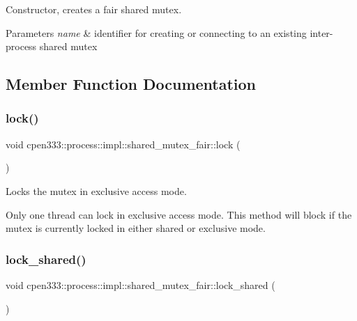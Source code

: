 Constructor, creates a fair shared mutex. 


\begin{DoxyParams}{Parameters}
{\em name} & identifier for creating or connecting to an existing inter-\/process shared mutex \\
\hline
\end{DoxyParams}


\subsection{Member Function Documentation}
\mbox{\label{classcpen333_1_1process_1_1impl_1_1shared__mutex__fair_a85de84ee97bdf015411169a02935dc4d}} 
\subsubsection{\texorpdfstring{lock()}{lock()}}
{\footnotesize\ttfamily void cpen333\+::process\+::impl\+::shared\+\_\+mutex\+\_\+fair\+::lock (\begin{DoxyParamCaption}{ }\end{DoxyParamCaption})\hspace{0.3cm}{\ttfamily [inline]}}



Locks the mutex in exclusive access mode. 

Only one thread can lock in exclusive access mode. This method will block if the mutex is currently locked in either shared or exclusive mode. \mbox{\label{classcpen333_1_1process_1_1impl_1_1shared__mutex__fair_a11641159a61a83eda9713891f9f29159}} 
\subsubsection{\texorpdfstring{lock\+\_\+shared()}{lock\_shared()}}
{\footnotesize\ttfamily void cpen333\+::process\+::impl\+::shared\+\_\+mutex\+\_\+fair\+::lock\+\_\+shared (\begin{DoxyParamCaption}{ }\end{DoxyParamCaption})\hspace{0.3cm}{\ttfamily [inline]}}




